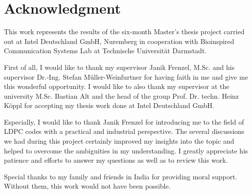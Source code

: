 \chapter*{Acknowledgment}
This work represents the results of the six-month Master’s thesis project carried out at Intel Deutschland GmbH, Nuremberg in cooperation with Bioinspired Communication Systems Lab at Technische Universität Darmstadt.

First of all, I would like to thank my supervisor Janik Frenzel, M.Sc. and his supervisor Dr.-Ing. Stefan M\"uller-Weinfurtner for having faith in me and give me this wonderful opportunity. I would like to also thank my supervisor at the university M.Sc. Bastian Alt and the head of the group Prof. Dr. techn. Heinz K\"oppl for accepting my thesis work done at Intel Deutschland GmbH.

Especially, I would like to thank Janik Frenzel for introducing me to the field of LDPC codes with a practical and industrial perspective. The several discussions we had during this project certainly improved my insights into the topic and helped to overcome the ambiguities in my understanding. I greatly appreciate his patience and efforts to answer my questions as well as to review this work.

Special thanks to my family and friends in India for providing moral support. Without them, this work would not have been possible.



